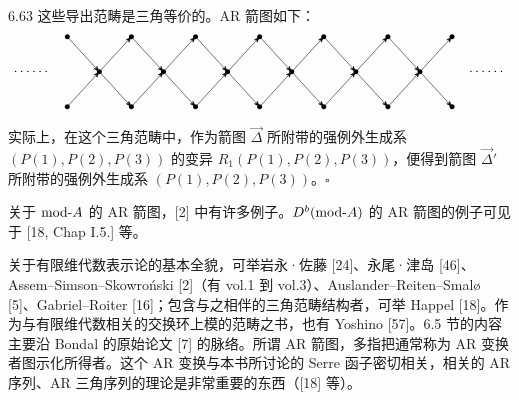 \begin{example}{6.63}
这些导出范畴是三角等价的。AR 箭图如下：
\[\begin{tikzpicture}[baseline=-0.5ex,x=0.82cm,y=0.9cm]
  \foreach \i in {0,...,6}{\node[circle,fill,inner sep=1.3pt] at (2*\i,2) {};}
  \foreach \i in {0,...,5}{\node[circle,fill,inner sep=1.3pt] at (2*\i+1,1) {};}
  \foreach \i in {0,...,6}{\node[circle,fill,inner sep=1.3pt] at (2*\i,0) {};}
  \foreach \i in {0,...,5}{
    \draw[-{Stealth}] (2*\i,2) -- (2*\i+1,1);
    \draw[-{Stealth}] (2*\i,0) -- (2*\i+1,1);
    \draw[-{Stealth}] (2*\i+1,1) -- (2*\i+2,2);
    \draw[-{Stealth}] (2*\i+1,1) -- (2*\i+2,0);
  }
  \node at (-1.1,1) {$\cdots\cdots$};
  \node at (13.1,1) {$\cdots\cdots$};
\end{tikzpicture}\]
实际上，在这个三角范畴中，作为箭图 $\vec{\Delta}$ 所附带的强例外生成系 $(P(1),P(2),P(3))$ 的变异 $R_1(P(1),P(2),P(3))$，便得到箭图 $\vec{\Delta}'$ 所附带的强例外生成系 $(P(1),P(2),P(3))$。\hfill$\square$
\end{example}

关于 $\mathrm{mod}\text{-}A$ 的 AR 箭图，[2] 中有许多例子。$D^{b}(\mathrm{mod}\text{-}A)$ 的 AR 箭图的例子可见于 [18, Chap I.5.] 等。

关于有限维代数表示论的基本全貌，可举岩永·佐藤 [24]、永尾·津岛 [46]、Assem--Simson--Skowro\'nski [2]（有 vol.1 到 vol.3）、Auslander--Reiten--Smal\o{} [5]、Gabriel--Roiter [16]；包含与之相伴的三角范畴结构者，可举 Happel [18]。作为与有限维代数相关的交换环上模的范畴之书，也有 Yoshino [57]。6.5 节的内容主要沿 Bondal 的原始论文 [7] 的脉络。所谓 AR 箭图，多指把通常称为 AR 变换者图示化所得者。这个 AR 变换与本书所讨论的 Serre 函子密切相关，相关的 AR 序列、AR 三角序列的理论是非常重要的东西（[18] 等）。

